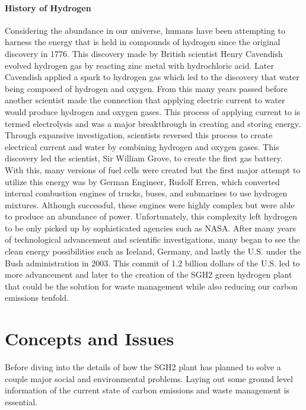 \documentclass[3p,sort]{elsarticle}
\begin{document}
\paragraph{History of Hydrogen} Considering the abundance in our universe, humans have been 
attempting to harness the energy that is held in compounds of hydrogen since the original 
discovery in 1776. This discovery made by British scientist Henry Cavendish evolved hydrogen 
gas by reacting zinc metal with hydrochloric acid. Later Cavendish applied a spark to hydrogen 
gas which led to the discovery that water  
being composed of hydrogen and oxygen. From this many years passed before another scientist 
made the connection that applying electric current to water would produce hydrogen and oxygen 
gases. This process of applying current to  is termed electrolysis and was a major 
breakthrough in creating and storing
energy. Through expansive investigation, scientists reversed this process to create electrical 
current and water by combining hydrogen and oxygen gases. This discovery
led the scientist, Sir William Grove, to create the first gas battery. With this, many versions 
of fuel cells were created but the first major attempt to utilize this energy was by German Engineer, 
Rudolf Erren, which converted internal combustion engines of trucks, buses, and submarines to use 
hydrogen mixtures. Although successful,
these engines were highly complex but were able to produce an abundance of power. Unfortunately, 
this complexity left hydrogen to be only picked up by sophisticated agencies such as NASA. After 
many years of technological advancement and scientific investigations, many began to see the clean 
energy possibilities such as Iceland, Germany, and lastly the U.S. 
under the Bush administration in 2003. This commit of 1.2 billion dollars of the U.S. led to more 
advancement and later to the creation of the SGH2 green hydrogen plant that could 
be the solution for waste management while also reducing our carbon emissions tenfold. 

\citep{bloomberg}


\section{Concepts and Issues}

Before diving into the details of how the SGH2 plant has planned to solve a couple major social 
and environmental problems. 
Laying out some ground level information of the current state of carbon emissions and waste 
management is essential.
\end{document}
